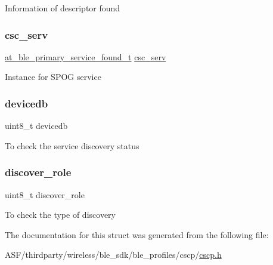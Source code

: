 Information of descriptor found \mbox{\label{structapp__csc__data_a64fd0cf7fe67381aafa1049e81962863}} 
\subsubsection{\texorpdfstring{csc\_serv}{csc\_serv}}
{\footnotesize\ttfamily \mbox{\hyperlink{structat__ble__primary__service__found__t}{at\+\_\+ble\+\_\+primary\+\_\+service\+\_\+found\+\_\+t}} \mbox{\hyperlink{structcsc__serv}{csc\+\_\+serv}}}

Instance for S\+P\+OG service \mbox{\label{structapp__csc__data_a0716913078c455c07a8a36037650970e}} 
\subsubsection{\texorpdfstring{devicedb}{devicedb}}
{\footnotesize\ttfamily uint8\+\_\+t devicedb}

To check the service discovery status \mbox{\label{structapp__csc__data_a6bbd9c0dd5adcc10a45804682b4a2fb5}} 
\subsubsection{\texorpdfstring{discover\_role}{discover\_role}}
{\footnotesize\ttfamily uint8\+\_\+t discover\+\_\+role}

To check the type of discovery 

The documentation for this struct was generated from the following file\+:\begin{DoxyCompactItemize}
\item 
A\+S\+F/thirdparty/wireless/ble\+\_\+sdk/ble\+\_\+profiles/cscp/\mbox{\hyperlink{cscp_8h}{cscp.\+h}}\end{DoxyCompactItemize}
